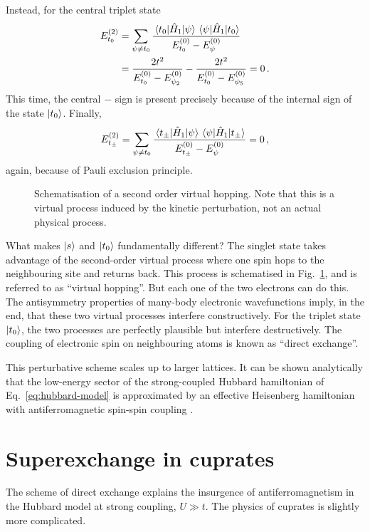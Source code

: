 Instead, for the central triplet state
\[
\begin{aligned}
	E_{t_0}^{(2)} &= \sum_{\psi \neq t_0} \frac{\mel{t_0}{\hat H_1}{\psi}\mel{\psi}{\hat H_1}{t_0}}{E_{t_0}^{(0)} - E_\psi^{(0)}} \\
	&= \frac{2t^2}{E_{t_0}^{(0)} - E_{\psi_2}^{(0)}} - \frac{2t^2}{E_{t_0}^{(0)} - E_{\psi_5}^{(0)}} = 0 \, .
\end{aligned}
\]
This time, the central $-$ sign is present precisely because of the internal sign of the state $\ket{t_0}$. Finally,
\[
	E_{t_\pm}^{(2)} = \sum_{\psi \neq t_0} \frac{\mel{t_\pm}{\hat H_1}{\psi}\mel{\psi}{\hat H_1}{t_\pm}}{E_{t_\pm}^{(0)} - E_\psi^{(0)}} = 0 \, ,
\]
again, because of Pauli exclusion principle.

\begin{figure}
	\centering
	
	\caption{Schematisation of a second order virtual hopping. Note that this is a virtual process induced by the kinetic perturbation, not an actual physical process.}
	\label{appfig:hubbard-2-virtual}
\end{figure}

What makes $\ket{s}$ and $\ket{t_0}$ fundamentally different? The singlet state takes advantage of the second-order virtual process where one spin hops to the neighbouring site and returns back. This process is schematised in Fig.~\ref{appfig:hubbard-2-virtual}, and is referred to as ``virtual hopping''. But each one of the two electrons can do this. The antisymmetry properties of many-body electronic wavefunctions imply, in the end, that these two virtual processes interfere constructively. For the triplet state $\ket{t_0}$, the two processes are perfectly plausible but interfere destructively. The coupling of electronic spin on neighbouring atoms is known as ``direct exchange''.

This perturbative scheme scales up to larger lattices. It can be shown analytically that the low-energy sector of the strong-coupled Hubbard hamiltonian of Eq.~\eqref{eq:hubbard-model} is approximated by an effective Heisenberg hamiltonian with antiferromagnetic spin-spin coupling \cite{cleveland1976obtaining}.

\section{Superexchange in cuprates}

The scheme of direct exchange explains the insurgence of antiferromagnetism in the Hubbard model at strong coupling, $U \gg t$. The physics of cuprates is slightly more complicated.

